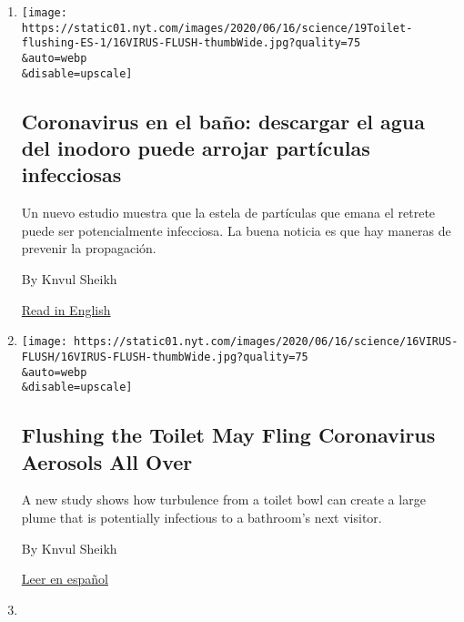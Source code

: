 \begin{enumerate}
\def\labelenumi{\arabic{enumi}.}
\item
  \href{/es/2020/06/19/espanol/coronavirus-infeccion-inodoro.html}{}

  \texttt{[image: https://static01.nyt.com/images/2020/06/16/science/19Toilet-flushing-ES-1/16VIRUS-FLUSH-thumbWide.jpg?quality=75\\\&auto=webp\\\&disable=upscale]}

  \hypertarget{coronavirus-en-el-bauxf1o-descargar-el-agua-del-inodoro-puede-arrojar-partuxedculas-infecciosas}{%
  \subsection{Coronavirus en el baño: descargar el agua del inodoro
  puede arrojar partículas
  infecciosas}\label{coronavirus-en-el-bauxf1o-descargar-el-agua-del-inodoro-puede-arrojar-partuxedculas-infecciosas}}

  Un nuevo estudio muestra que la estela de partículas que emana el
  retrete puede ser potencialmente infecciosa. La buena noticia es que
  hay maneras de prevenir la propagación.

  By Knvul Sheikh

  \href{https://www.nytimes.com/2020/06/16/health/coronavirus-toilets-flushing.html}{Read
  in English}
\item
  \href{/2020/06/16/health/coronavirus-toilets-flushing.html}{}

  \texttt{[image: https://static01.nyt.com/images/2020/06/16/science/16VIRUS-FLUSH/16VIRUS-FLUSH-thumbWide.jpg?quality=75\\\&auto=webp\\\&disable=upscale]}

  \hypertarget{flushing-the-toilet-may-fling-coronavirus-aerosols-all-over}{%
  \subsection{Flushing the Toilet May Fling Coronavirus Aerosols All
  Over}\label{flushing-the-toilet-may-fling-coronavirus-aerosols-all-over}}

  A new study shows how turbulence from a toilet bowl can create a large
  plume that is potentially infectious to a bathroom's next visitor.

  By Knvul Sheikh

  \href{https://www.nytimes.com/es/2020/06/19/espanol/coronavirus-infeccion-inodoro.html}{Leer
  en español}
\item
  \href{/2020/06/12/health/protests-rubber-bullets-beanbag.html}{}


\end{enumerate}
